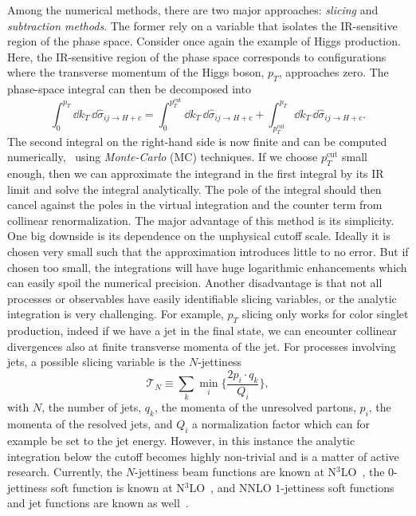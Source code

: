 Among the numerical methods, there are two major approaches: \textit{slicing} and \textit{subtraction methods}. The former rely on a variable that isolates the \acs{IR}-sensitive region of the phase space. Consider once again the example of Higgs production. Here, the IR-sensitive region of the phase space corresponds to configurations where the transverse momentum of the Higgs boson, $p_T$, approaches zero. The phase-space integral can then be decomposed into
\begin{equation}
\int_0^{p_T} \dd k_T \, \dd \hat{\sigma}_{ij \rightarrow H + c} = \int_0^{p_T^\text{cut}} \dd k_T \, \dd \hat{\sigma}_{ij \rightarrow H + c} + \int_{p_T^\text{cut}}^{p_T} \dd k_T \, \dd \hat{\sigma}_{ij \rightarrow H + c}.
\end{equation}
The second integral on the right-hand side is now finite and can be computed numerically, \eg\ using \textit{Monte-Carlo} (\acs{MC}) techniques. If we choose $p_T^{\text{cut}}$ small enough, then we can approximate the integrand in the first integral by its \acs{IR} limit and solve the integral analytically. The pole of the integral should then cancel against the poles in the virtual integration and the counter term from collinear renormalization. The major advantage of this method is its simplicity. One big  downside is its dependence on the unphysical cutoff scale. Ideally it is chosen very small such that the approximation introduces little to no error. But if chosen too small, the integrations will have huge logarithmic enhancements which can easily spoil the numerical precision. Another disadvantage is that not all processes or observables have easily identifiable slicing variables, or the analytic integration is very challenging. For example, $p_T$ slicing only works for color singlet production, indeed if we have a jet in the final state, we can encounter collinear divergences also at finite transverse momenta of the jet. For processes involving jets, a possible slicing variable is the $N$-jettiness
\begin{equation}
\mathcal{T}_N \equiv \sum_k \min_i\! \bigg \lbrace \frac{2 p_i \cdot q_k}{Q_i} \bigg \rbrace,
\end{equation}
with $N$, the number of jets, $q_k$, the momenta of the unresolved partons, $p_i$, the momenta of the resolved jets, and $Q_i$ a normalization factor which can for example be set to the jet energy. However, in this instance the analytic integration below the cutoff becomes highly non-trivial and is a matter of active research. Currently, the $N$-jettiness beam functions are known at N${}^3$LO~\cite{Ebert:2020unb}, the $0$-jettiness soft function is known at N${}^3$LO~\cite{Baranowski:2024vxg, Baranowski:2024ysi}, and \acs{NNLO} $1$-jettiness soft functions and jet functions are known as well~\cite{Campbell:2017hsw, Becher:2010pd, Becher:2006qw, Boughezal:2015eha}.

